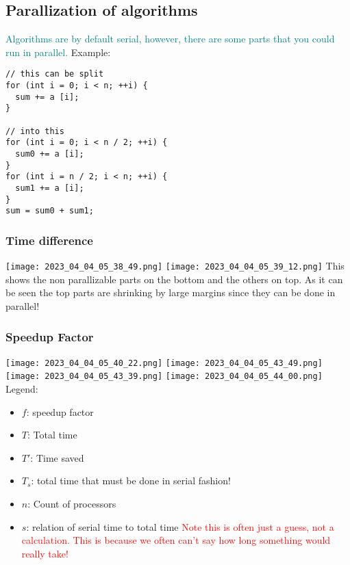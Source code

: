 \documentclass[main.tex,fontsize=8pt,paper=a4,paper=portrait,DIV=calc,]{scrartcl}
\begin{document}
\subsection{Parallization of algorithms}
\textcolor{teal}{Algorithms are by default serial, however, there are some parts that you could run in parallel.}\newline 
Example:
\begin{lstlisting}
// this can be split
for (int i = 0; i < n; ++i) {
  sum += a [i];
}

// into this
for (int i = 0; i < n / 2; ++i) {
  sum0 += a [i];
}
for (int i = n / 2; i < n; ++i) {
  sum1 += a [i];
}
sum = sum0 + sum1;
\end{lstlisting}

\subsubsection{Time difference}
\texttt{[image: 2023\_04\_04\_05\_38\_49.png]}
\texttt{[image: 2023\_04\_04\_05\_39\_12.png]}\newline
This shows the non parallizable parts on the bottom and the others on top.\newline
As it can be seen the top parts are shrinking by large margins since they can be done in parallel!\newline
\subsubsection{Speedup Factor}
\texttt{[image: 2023\_04\_04\_05\_40\_22.png]}
\texttt{[image: 2023\_04\_04\_05\_43\_49.png]}
\texttt{[image: 2023\_04\_04\_05\_43\_39.png]}
\texttt{[image: 2023\_04\_04\_05\_44\_00.png]}\newline
Legend:
\begin{itemize}
  \item \(f\): speedup factor 
\item \(T\): Total time
\item \(T'\): Time saved
\item \(T_s\): total time that must be done in serial fashion!
\item \(n\): Count of processors
\item \(s\): relation of serial time to total time\newline
  \textcolor{red}{Note this is often just a guess, not a calculation.\newline
  This is because we often can't say how long something would really take!}
\end{itemize} 
\end{document}
